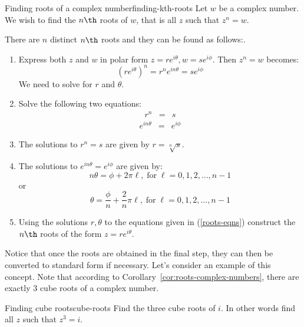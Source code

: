 \begin{procedure}{Finding roots of a complex number}{finding-kth-roots}
Let $w$ be a complex number. We wish to find the $n\th$ roots of $w$, that is all $z$ such that $z^n = w$.

There are $n$ distinct $n\th$ roots and they can be found as follows:.

\begin{enumerate}
\item Express both $z$ and $w$ in polar form $z=re^{i\theta}, w=se^{i\phi}$. Then $z^n = w$ becomes:
\[
(re^{i\theta})^n = r^n e^{i n \theta} = se^{i\phi}
\]
We need to solve for $r$ and $\theta$.
\item Solve the following two equations:
\begin{eqnarray*}
r^n &=& s
\end{eqnarray*}
\begin{eqnarray}
e^{i n \theta} &=& e^{i \phi}
\label{roots-eqns}
\end{eqnarray}
\item The solutions to $r^n = s$ are given by $r = \sqrt[n]{s}$.

\item The solutions to $e^{i n \theta} = e^{i \phi}$ are given by:
\[
n\theta = \phi + 2\pi \ell,  \; \mbox{for} \; \ell = 0,1,2,\ldots, n-1
\]
or
\[
\theta = \frac{\phi}{n} + \frac{2}{n} \pi \ell, \; \mbox{for} \; \ell = 0,1,2,\ldots, n-1
\]
\item
Using the solutions $r, \theta$ to the equations given in (\ref{roots-eqns})
construct the $n\th$ roots of the form $z = re^{i\theta}$.
\end{enumerate}
\end{procedure}

Notice that once the roots are obtained in the final step, they can then be converted to standard form if necessary. Let's consider an example of this concept. Note that according to Corollary~\ref{cor:roots-complex-numbers},
there are exactly $3$ cube roots of a complex number.

\begin{example}{Finding cube roots}{cube-roots}
Find the three cube roots of $i$. In other words find all $z$ such that $z^3 = i$.
\end{example}

